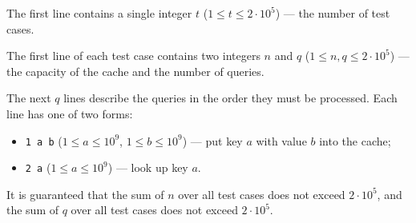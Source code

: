 The first line contains a single integer $t$ ($1 \le t \le 2 \cdot 10^5$) --- the number of test cases.

The first line of each test case contains two integers $n$ and $q$ ($1 \le n, q \le 2 \cdot 10^5$) --- the capacity of the cache and the number of queries.

The next $q$ lines describe the queries in the order they must be processed. Each line has one of two forms:

\begin{itemize}
  \item \texttt{1 a b} ($1 \le a \le 10^9$, $1 \le b \le 10^9$) --- put key $a$ with value $b$ into the cache;
  \item \texttt{2 a} ($1 \le a \le 10^9$) --- look up key $a$.
\end{itemize}

It is guaranteed that the sum of $n$ over all test cases does not exceed $2 \cdot 10^5$, and the sum of $q$ over all test cases does not exceed $2 \cdot 10^5$.
